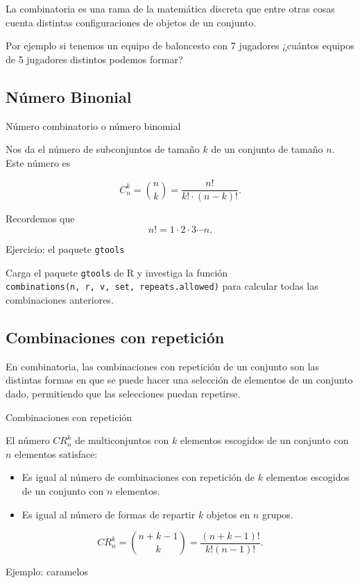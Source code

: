 \documentclass[
  letterpaper,
  DIV=11,
  numbers=noendperiod]{scrreprt}
\providecommand{\tightlist}{%
  \setlength{\itemsep}{0pt}\setlength{\parskip}{0pt}}\usepackage{longtable,booktabs,array}
\begin{document}
La combinatoria es una rama de la matemática discreta que entre otras
cosas cuenta distintas configuraciones de objetos de un conjunto.

Por ejemplo si tenemos un equipo de baloncesto con 7 jugadores ¿cuántos
equipos de 5 jugadores distintos podemos formar?

\subsection{Número Binonial}\label{nuxfamero-binonial}

Número combinatorio o número binomial

Nos da el número de subconjuntos de tamaño \(k\) de un conjunto de
tamaño \(n\). Este número es

\[
C_n^k={n\choose k} = \frac{n!}{k!\cdot (n-k)!}.
\]

Recordemos que \[
n!=1\cdot 2\cdot 3\cdots n.
\]

Ejercicio: el paquete \texttt{gtools}

Carga el paquete \texttt{gtools} de R y investiga la función
\texttt{combinations(n,\ r,\ v,\ set,\ repeats.allowed)} para calcular
todas las combinaciones anteriores.

\subsection{Combinaciones con
repetición}\label{combinaciones-con-repeticiuxf3n}

En combinatoria, las combinaciones con repetición de un conjunto son las
distintas formas en que se puede hacer una selección de elementos de un
conjunto dado, permitiendo que las selecciones puedan repetirse.

Combinaciones con repetición

El número \(CR_n^k\) de multiconjuntos con \(k\) elementos escogidos de
un conjunto con \(n\) elementos satisface:

\begin{itemize}
\tightlist
\item
  Es igual al número de combinaciones con repetición de \(k\) elementos
  escogidos de un conjunto con \(n\) elementos.
\item
  Es igual al número de formas de repartir \(k\) objetos en \(n\)
  grupos.
\end{itemize}

\[CR_n^k = \binom{n+k-1}{k} = \frac{(n+k-1)!}{k!(n-1)!}.\]

Ejemplo: caramelos
\end{document}
